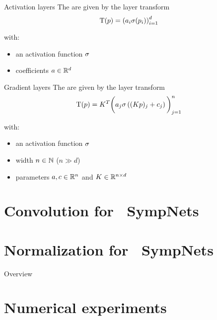 \begin{frame}[c]{Activation layers}
  The  are given by the layer transform
  \begin{equation*}
    \mathrm{T}(p) = \left( a_i \sigma(p_i) \right)_{i=1}^d
  \end{equation*}

  with:
  \begin{itemize}
    \item an activation function $\sigma$
    \item coefficients $a \in \mathbb{R}^d$ 
  \end{itemize}
\end{frame}

\begin{frame}[c]{Gradient layers}
  The  are given by the layer transform
  \begin{equation*}
    \mathrm{T}(p) = K^T \bigg( a_j \sigma \left( (Kp)_j + c_j \right) \bigg)_{j=1}^n
  \end{equation*}

  with:
  \begin{itemize}
    \item an activation function $\sigma$
    \item width $n \in \mathbb{N}$ ($n \gg d$)
    \item parameters $a,c \in \mathbb{R}^n$ and $K \in \mathbb{R}^{n \times d}$
  \end{itemize}
\end{frame}

\section{Convolution for ~\newline SympNets}

\section{Normalization for ~\newline SympNets}

\begin{frame}{Overview}
\end{frame}

\section{Numerical experiments}